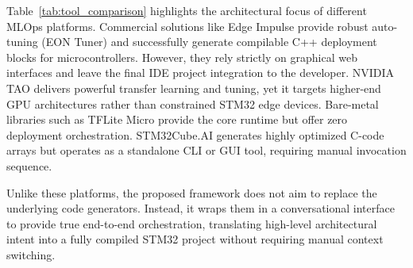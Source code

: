 Table~\ref{tab:tool_comparison} highlights the architectural focus of different MLOps platforms. Commercial solutions like Edge Impulse provide robust auto-tuning (EON Tuner) and successfully generate compilable C++ deployment blocks for microcontrollers. However, they rely strictly on graphical web interfaces and leave the final IDE project integration to the developer. NVIDIA TAO delivers powerful transfer learning and tuning, yet it targets higher-end GPU architectures rather than constrained STM32 edge devices. Bare-metal libraries such as TFLite Micro provide the core runtime but offer zero deployment orchestration. STM32Cube.AI generates highly optimized C-code arrays but operates as a standalone CLI or GUI tool, requiring manual invocation sequence.

Unlike these platforms, the proposed framework does not aim to replace the underlying code generators. Instead, it wraps them in a conversational interface to provide true end-to-end orchestration, translating high-level architectural intent into a fully compiled STM32 project without requiring manual context switching.
